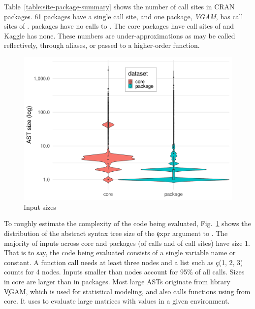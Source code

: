 \documentclass[conference]{IEEEtran}
\begin{document}
Table~\ref{table:site-package-summary} shows the number of call sites in
CRAN packages. 61 packages have a single call site, and one package, \emph{VGAM}, has \MaxCallSitePackage
call sites of \eval. \NoCallSitePackages packages have no calls to \eval. The core packages
have \NbCoreEvalCallSites call sites of \eval and Kaggle has none. These numbers are
under-approximations as \eval may be called reflectively, through aliases,
or passed to a higher-order function.

\begin{table}[ht]
\caption{Distribution of callsites in CRAN}
\label{table:site-package-summary}
\end{table}

\begin{figure}[!b]
	\centering
\includegraphics[width=\columnwidth]{ast_sizes}
\caption{Input sizes} \label{fig:ast-size}
\end{figure}

To roughly estimate the complexity of the code being evaluated,
Fig.~\ref{fig:ast-size} shows the distribution of the abstract syntax tree
size of the \c{expr} argument to \eval. The majority of inputs across core
and packages (\NbAstOnePercent of \eval calls and \NbAstOneCallSitePercent
of call sites) have size 1. That is to say, the code being evaluated
consists of a single variable name or constant. A function call needs at
least three nodes and a list such as \c{c(1, 2, 3)} counts for 4
nodes. Inputs smaller than \AstSizeNineFive nodes account for 95\% of all
calls. Sizes in core are larger than in packages. Most large ASTs originate
from library \c{VGAM}, which is used for statistical modeling, and also calls functions using \eval from core. It uses
\eval to evaluate large matrices with values in a given environment.
\end{document}
